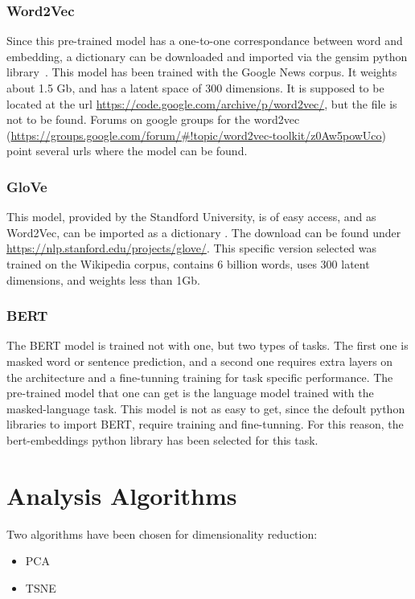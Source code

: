 \subsubsection{Word2Vec}\label{subs:Word2Vec}
Since this pre-trained model has a one-to-one correspondance between word and embedding, a dictionary can be downloaded and imported via the gensim python library~\cite{TODO}. This model has been trained with the Google News \cite{} corpus. It weights about 1.5 Gb, and has a latent space of 300 dimensions. It is supposed to be located at the url \url{https://code.google.com/archive/p/word2vec/}, but the file is not to be found. Forums on google groups for the word2vec (\url{https://groups.google.com/forum/#!topic/word2vec-toolkit/z0Aw5powUco}) point several urls where the model can be found.

\subsubsection{GloVe}\label{subs:GloVe}
This model, provided by the Standford University, is of easy access, and as Word2Vec, can be imported as a dictionary \cite{TODO}. The download can be found under \url{https://nlp.stanford.edu/projects/glove/}. This specific version selected was trained on the Wikipedia corpus, contains 6 billion words, uses 300 latent dimensions, and weights less than 1Gb.

\subsubsection{BERT}\label{subs:BERT}
The BERT model is trained not with one, but two types of tasks. The first one is masked word or sentence prediction, and a second one requires extra layers on the architecture and a fine-tunning training for task specific performance. \cite{TODO} The pre-trained model that one can get is the language model trained with the masked-language task. This model is not as easy to get, since the defoult python libraries to import BERT, require training and fine-tunning. For this reason, the bert-embeddings python library has been selected for this task.

\section{Analysis Algorithms}\label{sec:Analysis Algorithms}
Two algorithms have been chosen for dimensionality reduction:
\begin{itemize}
  \item PCA
  \item TSNE
\end{itemize}

